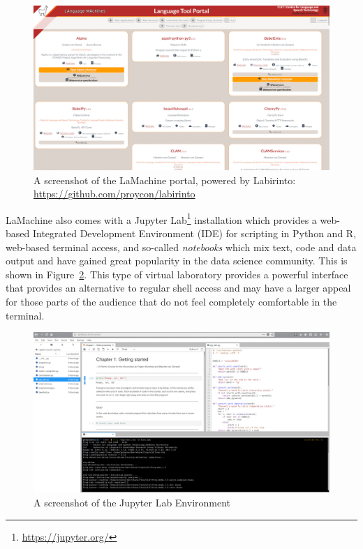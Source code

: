 \documentclass[a4paper,11pt]{article}
\begin{document}
\begin{figure}[htb] \begin{center}
\includegraphics[width=135.0mm]{screenshot_portal.jpg}
\end{center}
\caption{\footnotesize{A screenshot of the LaMachine portal, powered by Labirinto:
\url{https://github.com/proycon/labirinto}}}
\label{fig:portal}
\end{figure}

LaMachine also comes with a
Jupyter Lab\footnote{\url{https://jupyter.org/}} installation which provides a web-based Integrated Development
Environment (IDE) for scripting in Python and R, web-based terminal access, and so-called \emph{notebooks} which mix
text, code and data output and have gained great popularity in the data science community. This is shown in
Figure~\ref{fig:lab}. This type of virtual laboratory provides a powerful interface that provides an alternative to
regular shell access and may have a larger appeal for those parts of the audience that do not feel completely
comfortable in the terminal.

\begin{figure}[htb] \begin{center}
\includegraphics[width=135.0mm]{screenshot_lab.jpg}
\end{center}
\caption{\footnotesize{A screenshot of the Jupyter Lab Environment}}
\label{fig:lab}
\end{figure}
\end{document}
